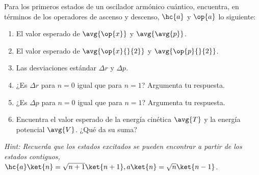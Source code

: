 \documentclass[../main.tex]{subfiles}
\begin{document}
\begin{problema}
	Para los primeros estados de un oscilador armónico cuántico,
	encuentra, en términos de los operadores de ascenso y descenso,
	\(\hc{a}\) y \(\op{a}\) lo siguiente:

	\begin{enumerate}
		\item El valor esperado de \( \avg{\op{x}}\) y \(\avg{\avg{p}}\).
		\item El valor esperado de \(\avg{\op{x}{}{2}}\) y \(\avg{\op{p}{}{2}}\).
		\item Las desviaciones estándar \(\Delta r\) y \(\Delta p\).
		\item ¿Es \(\Delta r\) para \(n = 0\) igual que para \(n = 1\)?
		      Argumenta tu respuesta.
		\item ¿Es \(\Delta p\) para \(n = 0\) igual que para \(n = 1\)?
		      Argumenta tu respuesta.
		\item Encuentra el valor esperado de la energía cinética \(\avg{T}\)
		      y la energía potencial \(\avg{V}\). ¿Qué da su suma?
	\end{enumerate}

	\emph{Hint: Recuerda que los estados excitados se pueden encontrar a partir
		de los estados contiguos, \(\hc{a}\ket{n} = \sqrt{n + 1}\ket{n + 1},
		a \ket{n} = \sqrt{n} \ket{n - 1}\)}.
\end{problema}
\end{document}
